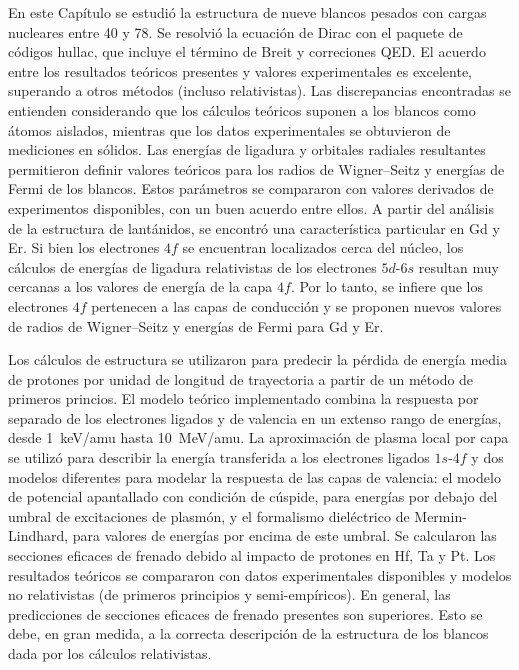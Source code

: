 En este Capítulo se estudió la estructura de nueve blancos pesados con 
cargas nucleares entre 40 y 78. Se resolvió la ecuación de Dirac con el 
paquete de códigos {\sc hullac}, que incluye el término de Breit y 
correciones QED. El acuerdo entre los resultados teóricos presentes y 
valores experimentales es excelente, superando a otros métodos (incluso 
relativistas). Las discrepancias encontradas se entienden considerando 
que los cálculos teóricos suponen a los blancos como átomos aislados, 
mientras que los datos experimentales se obtuvieron de mediciones en 
sólidos. Las energías de ligadura y orbitales radiales resultantes 
permitieron definir valores teóricos para los radios de Wigner--Seitz y 
energías de Fermi de los blancos. Estos parámetros se compararon con 
valores derivados de experimentos disponibles, con un buen acuerdo entre 
ellos. A partir del análisis de la estructura de lantánidos, se encontró 
una característica particular en Gd y Er. Si bien los electrones $4f$ se 
encuentran localizados cerca del núcleo, los cálculos de energías de 
ligadura relativistas de los electrones $5d$-$6s$ resultan muy cercanas 
a los valores de energía de la capa $4f$. Por lo tanto, se infiere que 
los electrones $4f$ pertenecen a las capas de conducción y se proponen 
nuevos valores de radios de Wigner--Seitz y energías de Fermi para Gd y 
Er. 

Los cálculos de estructura se utilizaron para predecir la pérdida de 
energía media de protones por unidad de longitud de trayectoria a partir 
de un método de primeros princios. El modelo teórico implementado 
combina la respuesta por separado de los electrones ligados y de 
valencia en un extenso rango de energías, desde 1~keV/amu hasta 
10~MeV/amu. La aproximación de plasma local por capa se utilizó para 
describir la energía transferida a los electrones ligados $1s$-$4f$ y 
dos modelos diferentes para modelar la respuesta de las capas de 
valencia: el modelo de potencial apantallado con condición de cúspide, 
para energías por debajo del umbral de excitaciones de plasmón, y el 
formalismo dieléctrico de Mermin-Lindhard, para valores de energías por 
encima de este umbral. Se calcularon las secciones eficaces de frenado 
debido al impacto de protones en Hf, Ta y Pt. Los resultados teóricos se 
compararon con datos experimentales disponibles y modelos no 
relativistas (de primeros principios y semi-empíricos). En general, las 
predicciones de secciones eficaces de frenado presentes son superiores.
Esto se debe, en gran medida, a la correcta descripción de la estructura 
de los blancos dada por los cálculos relativistas.


